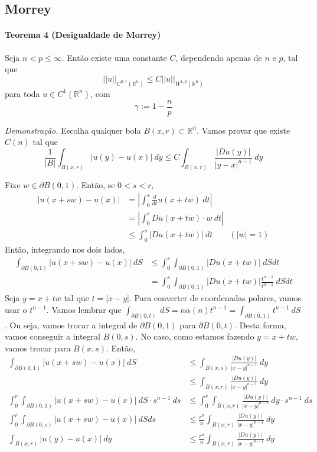 \documentclass[11pt]{article}
\newcommand{\Rn}{{\mathbb{R}^n}}
\newcommand{\p}{\partial}
\begin{document}
\subsection{Morrey}

\paragraph{Teorema 4 (Desigualdade de Morrey)}\label{t:sobolev-ineq-t4} Seja \( n < p \leq \infty \). Então existe uma constante \( C\), dependendo apenas de \(n\) e \(p\), tal que \[ ||u||_{C^{0, \gamma}(\Rn)} \leq C ||u||_{W^{1,p}(\Rn)} \] para toda \( u \in C^1 (\Rn)\), com \[ \gamma := 1 - \frac{n}{p} \]

\textit{Demonstração.} Escolha qualquer bola $B(x,r) \subset \Rn$. Vamos provar que existe $ C(n) $ tal que \[ \frac{1}{|B|} \int_{B(x,r)} |u(y) - u(x)| \ dy \leq C \int_{B(x,r)}  \frac{|Du(y)|}{|y-x|^{n-1}}\ dy   \]

Fixe $w \in \p B(0,1)$. Então, se $0 < s < r$, \begin{align*}
	| u(x+sw) - u(x) | &= \left| \int_0^s \frac{d}{dt}u(x + tw)\ dt \right| \\
	&= \left| \int_0^s Du(x+tw)\cdot w \ dt\right| \\
	& \leq \int_0^s \left| Du(x+tw) \right| \ dt \qquad (|w|=1)
\end{align*} Então, integrando nos dois lados,
\begin{align*}
	\int_{\p B(0,1)} | u(x+sw) - u(x) |\ dS &\leq \int_0^s \int_{\p B(0,1)}  \left| Du(x+tw) \right| \ dS dt \\
	&= \int_0^s \int_{\p B(0,1)}  \left| Du(x+tw) \right| \frac{t^{n-1}}{t^{n-1}} \ dS dt 
\end{align*} Seja $y=x+tw$ tal que $t = |x-y|$. Para converter de coordenadas polares, vamos usar o $t^{n-1}$. Vamos lembrar que $\int_{\p B(0,t)}\ dS = n \alpha(n) t^{n-1} = \int_{\p B(0,1)} t^{n-1}\ dS$. Ou seja, vamos trocar a integral de $\p B(0,1)$ para $\p B(0,t)$. Desta forma, vamos conseguir a integral $B(0,s)$. No caso, como estamos fazendo $y=x+tw$, vamos trocar para $B(x,s)$. Então, \begin{align*}
\int_{\p B(0,1)} | u(x+sw) - u(x) |\ dS &\leq \int_{B(x,s)} \frac{|Du(y)|}{|x-y|^{n-1}}\ dy \\
&\leq \int_{B(x,r)} \frac{|Du(y)|}{|x-y|^{n-1}}\ dy \\
\int_0^r \int_{\p B(0,1)} | u(x+sw) - u(x) |\ dS \cdot s^{n-1}\ ds &\leq \int_0^r \int_{B(x,r)} \frac{|Du(y)|}{|x-y|^{n-1}}\ dy \cdot s^{n-1}\ ds\\
\int_0^r \int_{\p B(0,s)} | u(x+sw) - u(x) |\ dS ds &\leq \frac{r^n}{n} \int_{B(x,r)} \frac{|Du(y)|}{|x-y|^{n-1}}\ dy  \\
\int_{ B(x,r)} | u(y) - u(x) |\ dy &\leq \frac{r^n}{n} \int_{B(x,r)} \frac{|Du(y)|}{|x-y|^{n-1}}\ dy 
\end{align*}
\end{document}
